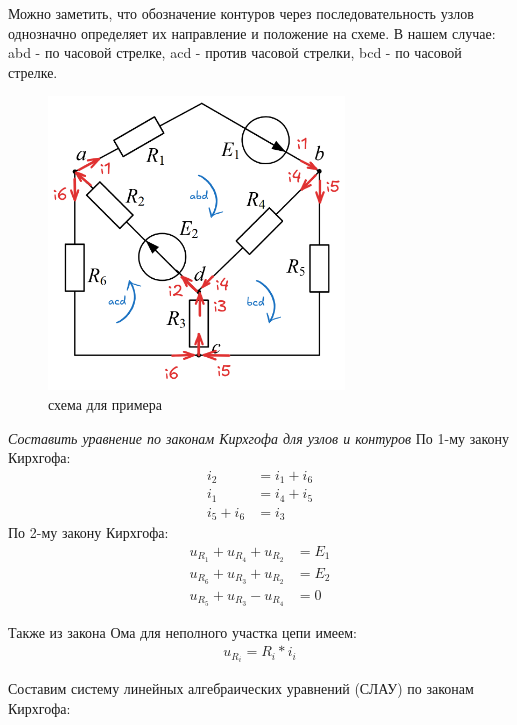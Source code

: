 Можно заметить, что обозначение контуров через последовательность узлов однозначно определяет их направление и положение на схеме.
В нашем случае:
abd - по часовой стрелке, 
acd - против часовой стрелки, 
bcd - по часовой стрелке.



\begin{figure}[H]
    \centering
    \includegraphics[width=0.7\textwidth]{images/Klaws_kontours_nodes.png}
    \caption{схема для примера}
    \label{fig:example}
\end{figure}



\textit{Составить уравнение по законам Кирхгофа для узлов и контуров}
По 1-му закону Кирхгофа:
\begin{align}
    i_2 &= i_1 + i_6 \tag{a} \\
    i_1 &= i_4 + i_5 \tag{b} \\
    i_5 + i_6 &= i_3 \tag{c}
\end{align}
По 2-му закону Кирхгофа:
\begin{align}
    u_{R_1} + u_{R_4} + u_{R_2} &= E_1 \tag{abd} \\
    u_{R_6} + u_{R_3} + u_{R_2} &= E_2 \tag{acd} \\
    u_{R_5} + u_{R_3} - u_{R_4} &= 0 \tag{bcd}
\end{align}

Также из закона Ома для неполного участка цепи имеем:
\begin{align}
    u_{R_i} = R_i * i_i
\end{align}

Составим систему линейных алгебраических уравнений (СЛАУ) по законам Кирхгофа:

